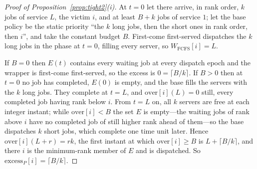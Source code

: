 \documentclass[mathematics,supfile,submit,moreauthors]{Definitions/mdpi}
\begin{document}
\begin{proof}[Proof of Proposition~\ref{prop:tight2}(i)]
At $t = 0$ let there arrive, in rank order, $k$ jobs of service $L$, the victim
$i$, and at least $B + k$ jobs of service $1$; let the base policy be the static
priority ``the $k$ long jobs, then the short ones in rank order, then $i$'', and
take the
constant budget $B$. First-come first-served dispatches the $k$ long jobs in the
phase at $t = 0$, filling every server, so $W_{\mathrm{FCFS}}[i] = L$.

If $B = 0$ then $E(t)$ contains every waiting job at every dispatch epoch and the
wrapper is first-come first-served, so the excess is $0 = \lceil B/k \rceil$. If
$B > 0$ then at $t = 0$ no job has completed, $E(0)$ is empty, and the base fills
the servers with the $k$ long jobs. They complete at $t = L$, and
$\mathrm{over}[i](L) = 0$ still, every completed job having rank below $i$. From
$t = L$ on, all $k$ servers are free at each integer instant; while
$\mathrm{over}[i] < B$ the set $E$ is empty---the waiting jobs of rank above
$i$ have no completed job of still higher rank ahead of them---so the base
dispatches $k$ short jobs, which complete one time unit later. Hence
$\mathrm{over}[i](L + r) = rk$, the first instant at which
$\mathrm{over}[i] \ge B$ is $L + \lceil B/k \rceil$, and there $i$ is the
minimum-rank member of $E$ and is dispatched. So
$\mathrm{excess}_P[i] = \lceil B/k \rceil$.
\end{proof}
\end{document}
